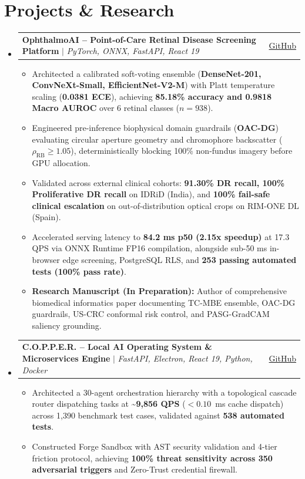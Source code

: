 \documentclass[letterpaper,10pt]{article}
\makeatletter
\newcommand{\resumeItem}[1]{
  \item\small{
    {#1 \vspace{-2pt}}
  }
}
\newcommand{\resumeProjectHeading}[2]{
    \vspace{-1pt}\item
    \begin{tabular*}{0.97\textwidth}{l@{\extracolsep{\fill}}r}
      \small#1 & #2 \\
    \end{tabular*}\vspace{-5pt}
}
\newcommand{\resumeSubHeadingListStart}{\begin{itemize}[leftmargin=0.15in, label={}]}
\newcommand{\resumeSubHeadingListEnd}{\end{itemize}}
\newcommand{\resumeItemListStart}{\begin{itemize}[leftmargin=0.15in]}
\newcommand{\resumeItemListEnd}{\end{itemize}\vspace{-4pt}}
\makeatother
\begin{document}
\section{Projects \& Research}
    \resumeSubHeadingListStart
      \resumeProjectHeading
          {\textbf{OphthalmoAI -- Point-of-Care Retinal Disease Screening Platform} $|$ \emph{PyTorch, ONNX, FastAPI, React 19}}{\href{https://github.com/AkashKundu114/OphthalmoAI}{GitHub}}
          \resumeItemListStart
            \resumeItem{Architected a calibrated soft-voting ensemble (\textbf{DenseNet-201, ConvNeXt-Small, EfficientNet-V2-M}) with Platt temperature scaling (\textbf{0.0381 ECE}), achieving \textbf{85.18\% accuracy and 0.9818 Macro AUROC} over 6 retinal classes ($n=938$).}
            \resumeItem{Engineered pre-inference biophysical domain guardrails (\textbf{OAC-DG}) evaluating circular aperture geometry and chromophore backscatter ($\rho_{\text{RB}} \ge 1.05$), deterministically blocking 100\% non-fundus imagery before GPU allocation.}
            \resumeItem{Validated across external clinical cohorts: \textbf{91.30\% DR recall, 100\% Proliferative DR recall} on IDRiD (India), and \textbf{100\% fail-safe clinical escalation} on out-of-distribution optical crops on RIM-ONE DL (Spain).}
            \resumeItem{Accelerated serving latency to \textbf{84.2 ms p50 (2.15x speedup)} at 17.3 QPS via ONNX Runtime FP16 compilation, alongside sub-50 ms in-browser edge screening, PostgreSQL RLS, and \textbf{253 passing automated tests (100\% pass rate)}.}
            \resumeItem{\textbf{Research Manuscript (In Preparation):} Author of comprehensive biomedical informatics paper documenting TC-MBE ensemble, OAC-DG guardrails, US-CRC conformal risk control, and PASG-GradCAM saliency grounding.}
          \resumeItemListEnd

      \resumeProjectHeading
          {\textbf{C.O.P.P.E.R. -- Local AI Operating System \& Microservices Engine} $|$ \emph{FastAPI, Electron, React 19, Python, Docker}}{\href{https://github.com/AkashKundu114/COPPER}{GitHub}}
          \resumeItemListStart
            \resumeItem{Architected a 30-agent orchestration hierarchy with a topological cascade router dispatching tasks at \textbf{\textasciitilde 9,856 QPS} ($<0.10$~ms cache dispatch) across 1,390 benchmark test cases, validated against \textbf{538 automated tests}.}
            \resumeItem{Constructed Forge Sandbox with AST security validation and 4-tier friction protocol, achieving \textbf{100\% threat sensitivity across 350 adversarial triggers} and Zero-Trust credential firewall.}
          \resumeItemListEnd
    \resumeSubHeadingListEnd
\end{document}
